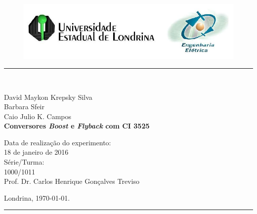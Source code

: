 \begin{titlepage}
  \begin{center}
    \begin{figure}[h]
      \includegraphics[scale=0.76]{img/topdotitulo.png}
    \end{figure}
    \rule{\columnwidth}{1.5mm}
    \
    
    \large David Maykon Krepsky Silva\\
    Barbara Sfeir\\
    Caio Julio K. Campos\\
    
    \vspace{4cm}
    {\bf \Large Conversores \textit{Boost} e \textit{Flyback} com CI 3525}
    \vspace{3.5cm}
    
    \begin{flushright}
      Data de realização do experimento:\\
      18 de janeiro de 2016\\
      Série/Turma:\\
      1000/1011\\
      Prof. Dr. Carlos Henrique Gonçalves Treviso
    \end{flushright}
    
    \vspace{3.2cm}
    Londrina, \today.
    
    \rule{\columnwidth}{1.3mm}
  \end{center}
\end{titlepage}